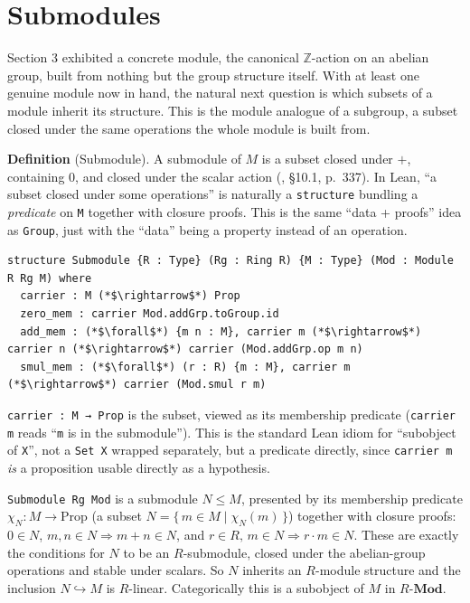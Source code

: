 \section{Submodules}\label{sec:11-modules:04-submodules:1}

Section 3 exhibited a concrete module, the canonical \(\mathbb{Z}\)-action on an abelian group, built from nothing but the group structure itself. With at least one genuine module now in hand, the natural next question is which subsets of a module inherit its structure. This is the module analogue of a subgroup, a subset closed under the same operations the whole module is built from.

\textbf{Definition} (Submodule). A submodule of \(M\) is a subset closed under \(+\), containing \(0\), and closed under the scalar action (\cite{DummitFoote2003}, §10.1, p.~337). In Lean, ``a subset closed under some operations'' is naturally a \texttt{structure} bundling a \emph{predicate} on \texttt{M} together with closure proofs. This is the same ``data + proofs'' idea as \texttt{Group}, just with the ``data'' being a property instead of an operation.

\begin{lstlisting}
structure Submodule {R : Type} (Rg : Ring R) {M : Type} (Mod : Module R Rg M) where
  carrier : M (*$\rightarrow$*) Prop
  zero_mem : carrier Mod.addGrp.toGroup.id
  add_mem : (*$\forall$*) {m n : M}, carrier m (*$\rightarrow$*) carrier n (*$\rightarrow$*) carrier (Mod.addGrp.op m n)
  smul_mem : (*$\forall$*) (r : R) {m : M}, carrier m (*$\rightarrow$*) carrier (Mod.smul r m)
\end{lstlisting}

\texttt{carrier : M → Prop} is the subset, viewed as its membership predicate (\texttt{carrier m} reads ``\texttt{m} is in the submodule''). This is the standard Lean idiom for ``subobject of \texttt{X}'', not a \texttt{Set X} wrapped separately, but a predicate directly, since \texttt{carrier m} \emph{is} a proposition usable directly as a hypothesis.

\begin{mathreading}

\texttt{Submodule Rg Mod} is a submodule \(N \le M\), presented by its membership predicate \(\chi_N : M \to \mathrm{Prop}\) (a subset \(N = \{\,m \in M \mid \chi_N(m)\,\}\)) together with closure proofs: \(0 \in N\), \(m,n \in N \Rightarrow m+n \in N\), and \(r\in R,\, m\in N
\Rightarrow r\cdot m \in N\). These are exactly the conditions for \(N\) to be an \(R\)-submodule, closed under the abelian-group operations and stable under scalars. So \(N\) inherits an \(R\)-module structure and the inclusion \(N \hookrightarrow M\) is \(R\)-linear. Categorically this is a subobject of \(M\) in \(R\text{-}\mathbf{Mod}\).

\end{mathreading}

